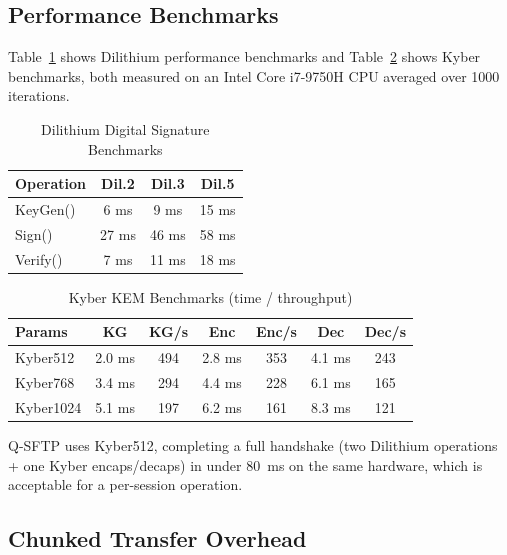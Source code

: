 \subsection{Performance Benchmarks}

Table~\ref{tab:dilithium} shows Dilithium performance benchmarks
and Table~\ref{tab:kyber} shows Kyber benchmarks, both measured on an
Intel Core i7-9750H CPU averaged over 1000 iterations.

\begin{table}[htbp]
  \centering
  \caption{Dilithium Digital Signature Benchmarks}
  \label{tab:dilithium}
  \begin{tabular}{lccc}
    \toprule
    \textbf{Operation} & \textbf{Dil.2} & \textbf{Dil.3}
                       & \textbf{Dil.5} \\
    \midrule
    KeyGen()  & 6 ms  & 9 ms  & 15 ms \\
    Sign()    & 27 ms & 46 ms & 58 ms \\
    Verify()  & 7 ms  & 11 ms & 18 ms \\
    \bottomrule
  \end{tabular}
\end{table}

\begin{table}[htbp]
  \centering
  \caption{Kyber KEM Benchmarks (time / throughput)}
  \label{tab:kyber}
  \begin{tabular}{lcccccc}
    \toprule
    \textbf{Params} & \textbf{KG} & \textbf{KG/s}
                    & \textbf{Enc} & \textbf{Enc/s}
                    & \textbf{Dec} & \textbf{Dec/s} \\
    \midrule
    Kyber512  & 2.0 ms & 494 & 2.8 ms & 353 & 4.1 ms & 243 \\
    Kyber768  & 3.4 ms & 294 & 4.4 ms & 228 & 6.1 ms & 165 \\
    Kyber1024 & 5.1 ms & 197 & 6.2 ms & 161 & 8.3 ms & 121 \\
    \bottomrule
  \end{tabular}
\end{table}

Q-SFTP uses Kyber512, completing a full handshake (two Dilithium
operations + one Kyber encaps/decaps) in under 80~ms on the same
hardware, which is acceptable for a per-session operation.

\subsection{Chunked Transfer Overhead}

